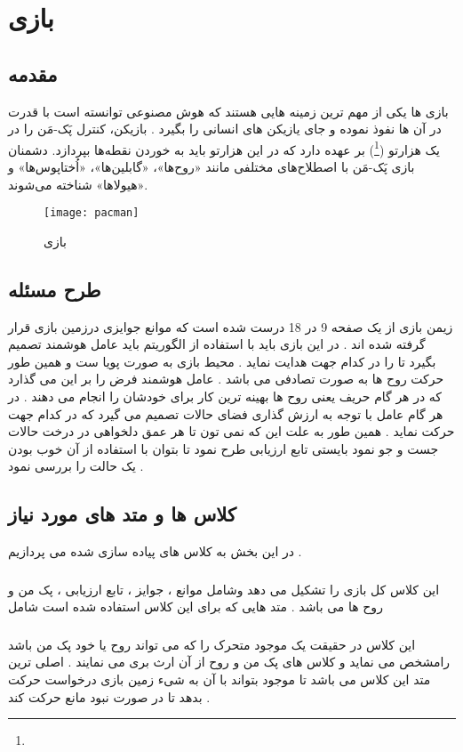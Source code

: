 \chapter{بازی }
\section{مقدمه}
\par
بازی ها یکی از مهم ترین زمینه هایی هستند که هوش مصنوعی توانسته است با قدرت در آن ها نفوذ نموده و جای یازیکن های انسانی را بگیرد . بازیکن، کنترل پَک-مَن را در یک هزارتو (\footnote{}) بر عهده دارد که در این هزارتو باید به خوردن نقطه‌ها بپردازد. دشمنان بازی پَک-مَن با اصطلاح‌های مختلفی مانند «روح‌ها»، «گابلین‌ها»، «اُختاپوس‌ها» و «هیولاها» شناخته می‌شوند.
\begin{figure}[h]
	\texttt{[image: pacman]}
	\centering
	\caption{بازی }
	\cite{NoahWardrip}
	\label{fig2}
\end{figure} 
\section{طرح مسئله}
زیمن بازی از یک صفحه 9 در 18 درست شده است که موانع جوایزی درزمین بازی قرار گرفته شده اند . در این بازی باید با استفاده از الگوریتم 
باید عامل هوشمند تصمیم بگیرد تا 
را در کدام جهت هدایت نماید . محیط بازی به صورت پویا ست و همین طور حرکت روح ها به صورت تصادفی می باشد . عامل هوشمند فرض را بر این می گذارد که در هر گام حریف یعنی روح ها بهینه ترین کار برای خودشان را انجام می دهند . در هر گام عامل با توجه به ارزش گذاری فضای حالات تصمیم می گیرد که در کدام جهت حرکت نماید . همین طور به علت این که نمی تون تا هر عمق دلخواهی در درخت حالات جست و جو نمود بایستی تابع ارزیابی طرح نمود تا بتوان با استفاده از آن خوب بودن یک حالت را بررسی نمود .
\section{کلاس ها و متد های  مورد نیاز}
در این بخش به کلاس های پیاده سازی شده می پردازیم .
\subsection{}
این کلاس کل بازی را تشکیل می دهد وشامل موانع ، جوایز ، تابع ارزیابی ، پک من و روح ها می باشد . متد هایی که برای این کلاس استفاده شده است شامل

\subsection{}
این کلاس در حقیقت یک موجود متحرک را که می تواند روح یا خود پک من باشد رامشخص می نماید و کلاس های پک من و روح از آن ارث بری می نمایند . اصلی ترین متد این کلاس 
می باشد تا موجود بتواند با آن به شیء زمین بازی 
 درخواست حرکت بدهد تا در صورت نبود مانع حرکت کند . 
